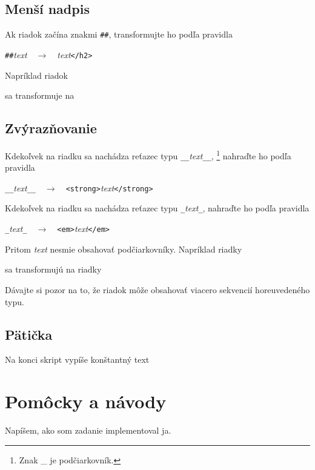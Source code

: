\documentclass{article}
\newcommand{\codefile}[1]{\begin{framed}\end{framed}}
\newcommand{\codefilesmall}[1]{\begin{framed}\small\end{framed}}
\begin{document}
\subsection{Menší nadpis}
Ak riadok začína znakmi {\tt \#\#\textvisiblespace}, transformujte ho podľa
pravidla
\begin{center}
{\tt \#\#\textvisiblespace}{\em text}$\quad\to\quad${\tt <h2>}{\em text}{\tt </h2>}
\end{center}
Napríklad riadok
\codefile{h2.md}
sa transformuje na
\codefile{h2.html}
\subsection{Zvýrazňovanie}
Kdekoľvek na riadku sa nachádza reťazec typu {\tt \_\_}{\em text}{\tt \_\_},
\footnote{Znak \_ je podčiarkovník.}
nahraďte ho podľa pravidla
\begin{center}
{\tt \_\_}{\em text}{\tt \_\_}$\quad\to\quad${\tt <strong>}{\em text}{\tt </strong>}
\end{center}
Kdekoľvek na riadku sa nachádza reťazec typu {\tt \_}{\em text}{\tt \_},
nahraďte ho podľa pravidla
\begin{center}
{\tt \_}{\em text}{\tt \_}$\quad\to\quad${\tt <em>}{\em text}{\tt </em>}
\end{center}
Pritom {\em text} nesmie obsahovať podčiarkovníky.
Napríklad riadky
\codefile{emphasis.md}
sa transformujú na riadky
\codefilesmall{emphasis.html}
Dávajte si pozor na to, že riadok môže obsahovať viacero sekvencií horeuvedeného
typu.
\subsection{Pätička}
Na konci skript vypíše konštantný text
\begin{framed}

\end{framed}
\section{Pomôcky a návody}
Napíšem, ako som zadanie implementoval ja.
\end{document}
